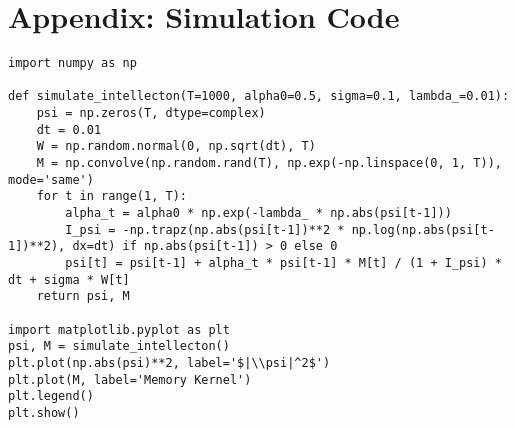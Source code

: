 \documentclass[11pt]{article}
\begin{document}
\section*{Appendix: Simulation Code}
\begin{lstlisting}
import numpy as np

def simulate_intellecton(T=1000, alpha0=0.5, sigma=0.1, lambda_=0.01):
    psi = np.zeros(T, dtype=complex)
    dt = 0.01
    W = np.random.normal(0, np.sqrt(dt), T)
    M = np.convolve(np.random.rand(T), np.exp(-np.linspace(0, 1, T)), mode='same')
    for t in range(1, T):
        alpha_t = alpha0 * np.exp(-lambda_ * np.abs(psi[t-1]))
        I_psi = -np.trapz(np.abs(psi[t-1])**2 * np.log(np.abs(psi[t-1])**2), dx=dt) if np.abs(psi[t-1]) > 0 else 0
        psi[t] = psi[t-1] + alpha_t * psi[t-1] * M[t] / (1 + I_psi) * dt + sigma * W[t]
    return psi, M

import matplotlib.pyplot as plt
psi, M = simulate_intellecton()
plt.plot(np.abs(psi)**2, label='$|\\psi|^2$')
plt.plot(M, label='Memory Kernel')
plt.legend()
plt.show()
\end{lstlisting}



\end{document}
